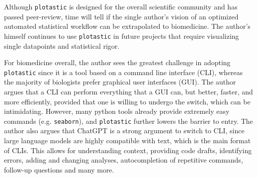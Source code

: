 
\label{sec:challenges_plotastic_cancer}
Although \texttt{plotastic} is designed for the overall scientific community and
has passed peer-review, time will tell if the single author's vision of an
optimized automated statistical workflow can be extrapolated to biomedicine. The
author's himself continues to use \texttt{plotastic} in future projects that
require visualizing single datapoints and statistical rigor.

For biomedicine overall, the author sees the greatest challenge in adopting
\texttt{plotastic} since it is a tool based on a command line interface (CLI),
whereas the majority of biologists prefer graphical user interfaces (GUI). The
author argues that a CLI can perform everything that a GUI can, but better,
faster, and more efficiently, provided that one is willing to undergo the
switch, which can be intimidating. However, many python tools already provide
extremely easy commands (e.g. \texttt{seaborn}), and \texttt{plotastic} further
lowers the barrier to entry. The author also argues that ChatGPT is a strong
argument to switch to CLI, since large language models are highly compatible
with text, which is the main format of CLIs. This allows for understanding
context, providing code drafts, identifying errors, adding and changing
analyses, autocompletion of repetitive commands, follow-up questions and many
more.












